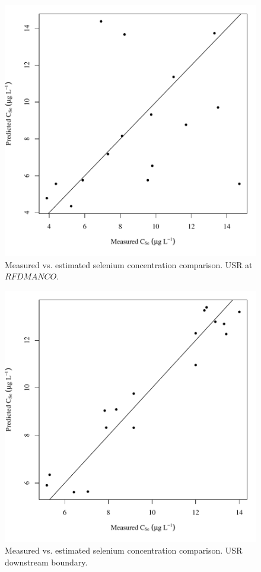 \begin{figure}[htbp]
	\begin{center}
	\includegraphics[width=6in]{"Figures/Results_USR/Conc Model pred v meas U167"}
	\caption{Measured vs. estimated selenium concentration comparison.  USR at $RFDMANCO$.}
	\end{center}
\end{figure}
\newpage

\begin{figure}[htbp]
	\begin{center}
	\includegraphics[width=6in]{"Figures/Results_USR/Conc Model pred v meas U201"}
	\caption{Measured vs. estimated selenium concentration comparison.  USR downstream boundary.}
	\end{center}
\end{figure}
\newpage

